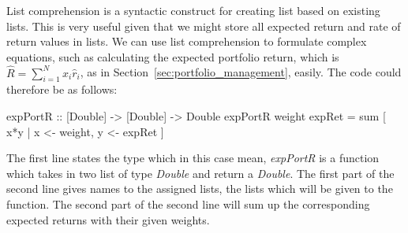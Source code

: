   List comprehension \cite{list_comp} is a syntactic construct for creating list based on existing lists. This is very useful given that we might store all expected return and rate of return values in lists. We can use list comprehension to formulate complex equations, such as calculating the expected portfolio return, which is $\widehat{R} = \sum_{i=1}^N  x_i \widehat{r}_i$, as in Section~\ref{sec:portfolio_management}, easily. The code could therefore be as follows: 
  \begin{code}
  expPortR :: [Double] -> [Double] -> Double
  expPortR weight expRet = sum [ x*y | x <- weight, y <- expRet ]
  \end{code}
  The first line states the type which in this case mean, \textit{expPortR} is a function which takes in two list of type \textit{Double} and return a \textit{Double}. The first part of the second line gives names to the assigned lists, the lists which will be given to the function. The second part of the second line will sum up the corresponding expected returns with their given weights. 

    

